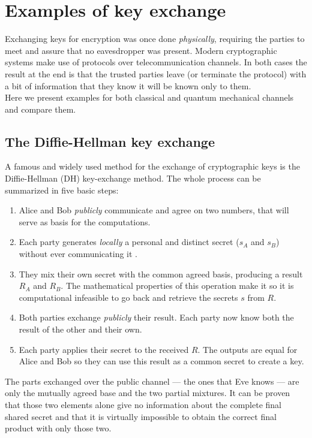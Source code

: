 \section{Examples of key exchange}
	Exchanging keys for encryption was once done \textit{physically}, requiring the parties to meet and assure that no eavesdropper was present.
	Modern cryptographic systems make use of protocols over telecommunication channels. 
	In both cases the result at the end is that the trusted parties leave (or terminate the protocol) with a bit of information that they know it will be known only to them.\\
	Here we present examples for both classical and quantum mechanical channels and compare them.
		\subsection{The Diffie-Hellman key exchange}
	
		A famous and widely used method for the exchange of cryptographic keys is the Diffie-Hellman (DH) key-exchange method.
	The whole process can be summarized in five basic steps:
	\begin{enumerate}
		\item Alice and Bob \emph{publicly} communicate and agree on two numbers, that will serve as basis for the computations.
		\item Each party generates \emph{locally} a personal and distinct secret ($s_A$ and $s_B$) without ever communicating it .
		\item They mix their own secret with the common agreed basis, producing a result $R_A$ and $R_B$. The mathematical properties of this operation make it so it is computational infeasible to go back and retrieve the secrets $s$ from $R$.
		\item Both parties exchange \emph{publicly} their result. Each party now know both the result of the other and their own.
		\item Each party applies their secret to the received $R$. The outputs are equal for Alice and Bob so they can use this result as a common secret to create a key.
	\end{enumerate}	 
	
	The parts exchanged over the public channel --- the ones that Eve knows --- are only the mutually agreed base and the two partial mixtures. 
	It can be proven that those two elements alone give no information about the complete final shared secret and that it is virtually impossible to obtain the correct final product with only those two.\\  
	
